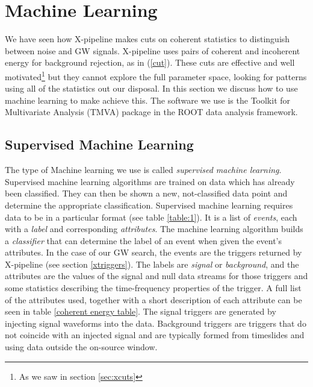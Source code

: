 \documentclass[11pt]{cuthesis}
\newcommand{\xp}{X-pipeline }
\begin{document}
\section{Machine Learning} \label{sec:ML}
We have seen how \xp makes cuts on coherent statistics to distinguish between noise and GW signals. \xp uses pairs of coherent and incoherent energy for background rejection, as in (\ref{cut}). These cuts are effective and well motivated\footnote{As we saw in section \ref{sec:xcuts}} but they cannot explore the full parameter space, looking for patterns using all of the statistics out our disposal. In this section we discuss how to use machine learning to make achieve this. The software we use is the Toolkit for Multivariate Analysis (TMVA) package in the ROOT data analysis framework. 

\subsection{Supervised Machine Learning}
The type of Machine learning we use is called \textit{supervised machine learning}. Supervised machine learning algorithms are trained on data which has already been classified. They can then be shown a new, not-classified data point and determine the appropriate classification. Supervised machine learning requires data to be in a particular format (see table \ref{table:1}). It is a list of \emph{events}, each with a \emph{label} and corresponding \emph{attributes}. The machine learning algorithm builds a \textit{classifier} that can determine the label of an event when given the event's attributes. In the case of our GW search, the events are the triggers returned by \xp (see section \ref{xtriggers}). The labels are \textit{signal} or \textit{background}, and the attributes are the values of the signal and null data streams for those triggers and some statistics describing the time-frequency properties of the trigger. A full list of the attributes used, together with a short description of each attribute can be seen in table \ref{coherent energy table}. The signal triggers are generated by injecting signal waveforms into the data. Background triggers are triggers that do not coincide with an injected signal and are typically formed from timeslides and using data outside the on-source window.

\end{document}
